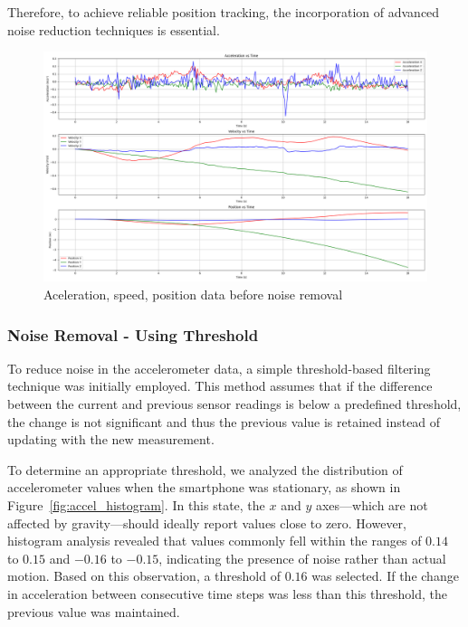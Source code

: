 \documentclass{article}
\begin{document}
Therefore, to achieve reliable position tracking, the incorporation of advanced noise reduction techniques is essential.

\FloatBarrier
\begin{figure}[h]
    \centering
    \includegraphics[width=\textwidth]{2_1_6_1.png}
    \caption{Aceleration, speed, position data before noise removal}
    \label{fig:integration_drift}
\end{figure}


\FloatBarrier
\subsubsection{Noise Removal - Using Threshold}

To reduce noise in the accelerometer data, a simple threshold-based filtering technique was initially employed. This method assumes that if the difference between the current and previous sensor readings is below a predefined threshold, the change is not significant and thus the previous value is retained instead of updating with the new measurement.

To determine an appropriate threshold, we analyzed the distribution of accelerometer values when the smartphone was stationary, as shown in Figure~\ref{fig:accel_histogram}. In this state, the $x$ and $y$ axes—which are not affected by gravity—should ideally report values close to zero. However, histogram analysis revealed that values commonly fell within the ranges of $0.14$ to $0.15$ and $-0.16$ to $-0.15$, indicating the presence of noise rather than actual motion. Based on this observation, a threshold of $0.16$ was selected. If the change in acceleration between consecutive time steps was less than this threshold, the previous value was maintained.
\end{document}
